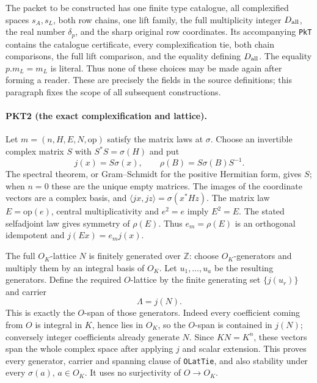 The packet to be constructed has one finite type catalogue, all complexified
spaces $s_A,s_L$, both row chains, one lift family, the full multiplicity
integer $D_{\rm all}$, the real number $\delta_p$, and the sharp original
row coordinates.  Its accompanying \texttt{PkT} contains the catalogue
certificate, every complexification tie, both chain comparisons, the full
lift comparison, and the equality defining $D_{\rm all}$.  The equality
$p.m_L=m_L$ is literal.  Thus none of these choices may be made again after
forming a reader.  These are precisely the fields in the source definitions;
this paragraph fixes the scope of all subsequent constructions.

\paragraph{PKT2 (the exact complexification and lattice).}\label{claim:PKT2}
Let $m=(n,H,E,N,\mathrm{op})$ satisfy the matrix laws at $\sigma$.
Choose an invertible complex matrix $S$ with $S^*S=\sigma(H)$ and put
\[
 j(x)=S\sigma(x),\qquad \rho(B)=S\sigma(B)S^{-1}.
 \tag{PKT.2}
\]
The spectral theorem, or Gram--Schmidt for the positive Hermitian form, gives
$S$; when $n=0$ these are the unique empty matrices.  The images of the
coordinate vectors are a complex basis, and
$\langle jx,jz\rangle=\sigma(x^*Hz)$.  The matrix law $E=\mathrm{op}(e)$,
central multiplicativity and $e^2=e$ imply $E^2=E$.  The stated selfadjoint
law gives symmetry of $\rho(E)$.  Thus $e_m=\rho(E)$ is an orthogonal
idempotent and $j(Ex)=e_mj(x)$.

The full $O_K$-lattice $N$ is finitely generated over $\mathbb Z$: choose
$O_K$-generators and multiply them by an integral basis of $O_K$.  Let
$u_1,\ldots,u_a$ be the resulting generators.  Define the required
$O$-lattice by the finite generating set $\{j(u_r)\}$ and carrier
\[
 \Lambda=j(N).\tag{PKT.3}
\]
This is exactly the $O$-span of those generators.  Indeed every coefficient
coming from $O$ is integral in $K$, hence lies in $O_K$, so the $O$-span is
contained in $j(N)$; conversely integer coefficients already generate $N$.
Since $KN=K^n$, these vectors span the whole complex space after applying
$j$ and scalar extension.  This proves every generator, carrier and spanning
clause of \texttt{OLatTie}, and also stability under every $\sigma(a)$,
$a\in O_K$.  It uses no surjectivity of $O\to O_K$.


